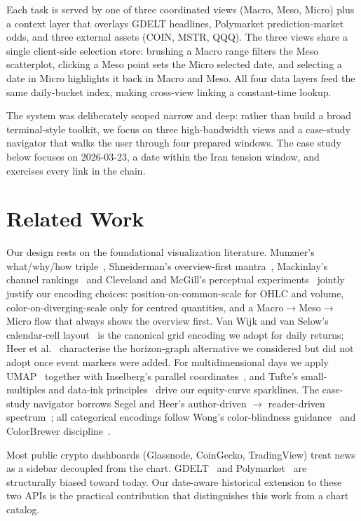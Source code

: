 \documentclass[journal,hideappendix]{vgtc}      %
\begin{document}
Each task is served by one of three coordinated views (Macro, Meso,
Micro) plus a context layer that overlays GDELT headlines, Polymarket
prediction-market odds, and three external assets (COIN, MSTR, QQQ).
The three views share a single client-side selection store: brushing a
Macro range filters the Meso scatterplot, clicking a Meso point sets the
Micro selected date, and selecting a date in Micro highlights it back in
Macro and Meso.  All four data layers feed the same daily-bucket index,
making cross-view linking a constant-time lookup.

The system was deliberately scoped narrow and deep: rather than
build a broad terminal-style toolkit, we focus on three high-bandwidth
views and a case-study navigator that walks the user through four
prepared windows.  The case study below focuses on 2026-03-23, a date within the Iran tension window, and exercises every link in the chain.

\section{Related Work}
\label{sec:related}

Our design rests on the foundational visualization literature.
Munzner's what/why/how triple~\cite{munzner2014},
Shneiderman's overview-first mantra~\cite{shneiderman1996}, Mackinlay's
channel rankings~\cite{mackinlay1986} and Cleveland and McGill's
perceptual experiments~\cite{cleveland1984} jointly justify our
encoding choices: position-on-common-scale for OHLC and volume,
color-on-diverging-scale only for centred quantities, and a
Macro$\to$Meso$\to$Micro flow that always shows the overview first.
Van Wijk and van Selow's calendar-cell layout~\cite{vanwijk1999} is the
canonical grid encoding we adopt for daily returns; Heer et
al.~\cite{heer2009} characterise the horizon-graph alternative we
considered but did not adopt once event markers were added.  For
multidimensional days we apply UMAP~\cite{mcinnes2018umap} together
with Inselberg's parallel coordinates~\cite{inselberg1985}, and Tufte's
small-multiples and data-ink principles~\cite{tufte2001} drive our
equity-curve sparklines.  The case-study navigator borrows Segel and
Heer's author-driven $\to$ reader-driven
spectrum~\cite{segel2010narrative}; all categorical encodings follow
Wong's color-blindness guidance~\cite{wong2011points} and ColorBrewer
discipline~\cite{colorbrewer}.

Most public crypto dashboards (Glassnode, CoinGecko, TradingView) treat
news as a sidebar decoupled from the chart.  GDELT~\cite{gdelt} and Polymarket~\cite{polymarket} are structurally biased toward today. Our date-aware historical extension to these two APIs is the practical contribution that distinguishes this work from a chart catalog.
\end{document}
